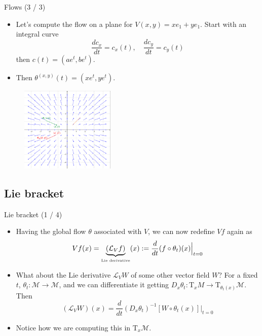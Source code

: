 \documentclass{beamer}
\begin{document}
\begin{frame}{Flows (3 / 3)}
    \begin{itemize}
        \item Let's compute the flow on a plane for $V(x, y) = xe_1 + ye_1$. Start with an integral curve 
        \begin{equation}
            \frac{dc_x}{dt} = c_x(t), \quad \frac{dc_y}{dt} = c_y(t) 
        \end{equation}
        then $c(t) = (ae^{t}, be^{t})$. 
        \item Then $\theta^{(x, y)}(t) = (xe^{t}, ye^{t})$.
    \end{itemize}
    \begin{figure}[h!]
        \includegraphics[width=0.4\textwidth]{images/flows.png}
    \end{figure}
\end{frame}

\subsection{Lie bracket}
\begin{frame}{Lie bracket (1 / 4)}
    \begin{itemize}
        \item Having the global flow $\theta$ associated with $V$, we can now redefine $Vf$ again as 
        \begin{equation}
            Vf(x) = \underbrace{(\mathcal{L}_V f)}_{\text{\tiny Lie derivative}}(x) := \frac{d}{dt} (f \circ \theta_t)(x) \Big|_{t = 0}
        \end{equation} 
        \item What about the Lie derivative $\mathcal{L}_V W$ of some other vector field $W$? For a fixed $t$, $\theta_t : \mathcal{M} \to \mathcal{M}$, and we can differentiate it getting $D_x\theta_t : \text{T}_{x}M \to \text{T}_{\theta_t(x)}\mathcal{M}$. Then 
        \begin{equation}
            (\mathcal{L}_V W)(x) = \frac{d}{dt} (D_x \theta_t)^{-1}[W\circ \theta_t(x)] \Big|_{t = 0}
        \end{equation}
        \item Notice how we are computing this in $\text{T}_x \mathcal{M}$.
    \end{itemize}
\end{frame}
\end{document}
